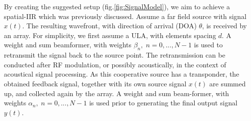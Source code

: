By creating the suggested setup (fig.\ref{fig:SignalModel}), we aim to achieve a spatial-IIR which was previously discussed. 
Assume a far field source with signal $x(t)$. 
The resulting wavefront, with direction of arrival (DOA) $\theta$, is received by an array. 
For simplicity, we first assume a ULA, with elements spacing $d$. A weight and sum beamformer, with weights $\beta_n,\;n=0,...,N-1$  is used to retransmit the signal back to the source point. 
The retransmission can be conducted after RF modulation, or possibly acoustically, in the context of acoustical signal processing. 
As this cooperative source has a transponder, the obtained feedback signal, together with its own source signal $x(t)$ are summed up, and collected again by the array. 
A weight and sum beam-former, with weights $\alpha_n,\;n=0,...,N-1$ is used prior to generating the final output signal $y(t)$.
